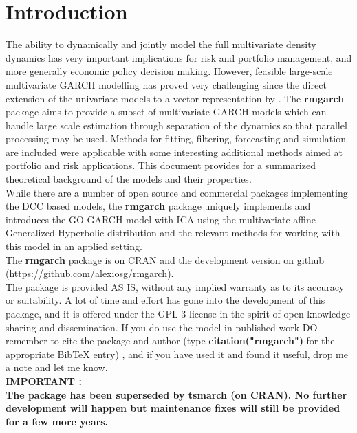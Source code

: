 \section{Introduction}
The ability to dynamically and jointly model the full multivariate density
dynamics has very important implications for risk and portfolio management,
and more generally economic policy decision making. However, feasible large-scale
multivariate GARCH modelling has proved very challenging since the direct extension
of the univariate models to a vector representation by \cite{Bollerslev1988}.
The {\bf rmgarch} package aims to provide a subset of multivariate GARCH models
which can handle large scale estimation through separation of the dynamics
so that parallel processing may be used. Methods for fitting, filtering,
forecasting and simulation are included were applicable with some interesting
additional methods aimed at portfolio and risk applications. This document provides
for a summarized theoretical background of the models and their properties.\\
While there are a number of open source and commercial packages implementing the
DCC based models, the {\bf rmgarch} package uniquely implements and introduces
the GO-GARCH model with ICA using the multivariate affine Generalized Hyperbolic
distribution and the relevant methods for working with this model in an applied setting.\\
The {\bf rmgarch} package is on CRAN and the development version on
github (\url{https://github.com/alexiosg/rmgarch}).\\
The package is provided AS IS, without any implied warranty as to its accuracy
or suitability. A lot of time and effort has gone into the development of this
package, and it is offered under the GPL-3 license in the spirit of open knowledge
sharing and dissemination. If you do use the model in published work DO remember
to cite the package and author (type {\bf citation("rmgarch")} for the
appropriate BibTeX entry) , and if you have used it and found it useful, drop me
a note and let me know.\\
\textbf{ IMPORTANT :\\
The package has been superseded by tsmarch (on CRAN). No further development will
happen but maintenance fixes will still be provided for a few more years.}
